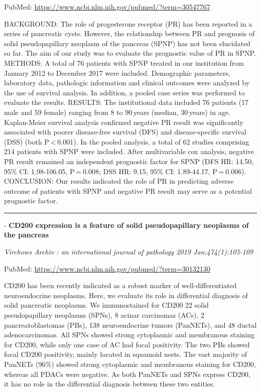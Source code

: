 \documentclass[]{article}
\begin{document}
PubMed: \url{https://www.ncbi.nlm.nih.gov/pubmed/?term=30547767}

BACKGROUND: The role of progesterone receptor (PR) has been reported in
a series of pancreatic cysts. However, the relationship between PR and
prognosis of solid pseudopapillary neoplasm of the pancreas (SPNP) has
not been elucidated so far. The aim of our study was to evaluate the
prognostic value of PR in SPNP. METHODS: A total of 76 patients with
SPNP treated in our institution from January 2012 to December 2017 were
included. Demographic parameters, laboratory data, pathologic
information and clinical outcomes were analyzed by the use of survival
analysis. In addition, a pooled case series was performed to evaluate
the results. RESULTS: The institutional data included 76 patients (17
male and 59 female) ranging from 8 to 90 years (median, 30 years) in
age. Kaplan-Meier survival analysis confirmed negative PR result was
significantly associated with poorer disease-free survival (DFS) and
disease-specific survival (DSS) (both P \textless{} 0.001). In the
pooled analysis, a total of 62 studies comprising 214 patients with SPNP
were included. After multivariable cox analysis, negative PR result
remained an independent prognostic factor for SPNP (DFS HR: 14.50, 95\%
CI: 1.98-106.05, P = 0.008; DSS HR: 9.15, 95\% CI: 1.89-44.17,
P = 0.006). CONCLUSION: Our results indicated the role of PR in
predicting adverse outcome of patients with SPNP and negative PR result
may serve as a potential prognostic factor.

{}

{}

\begin{center}\rule{0.5\linewidth}{\linethickness}\end{center}

 - \textbf{CD200 expression is a feature of solid pseudopapillary
neoplasms of the pancreas}

\emph{Virchows Archiv : an international journal of pathology 2019
Jan;474(1):105-109}

PubMed: \url{https://www.ncbi.nlm.nih.gov/pubmed/?term=30132130}

CD200 has been recently indicated as a robust marker of
well-differentiated neuroendocrine neoplasms. Here, we evaluate its role
in differential diagnosis of solid pancreatic neoplasms. We
immunostained for CD200 22 solid pseudopapillary neoplasms (SPNs), 8
acinar carcinomas (ACs), 2 pancreatoblastomas (PBs), 138 neuroendocrine
tumors (PanNETs), and 48 ductal adenocarcinomas. All SPNs showed strong
cytoplasmic and membranous staining for CD200, while only one case of AC
had focal positivity. The two PBs showed focal CD200 positivity, mainly
located in squamoid nests. The vast majority of PanNETs (96\%) showed
strong cytoplasmic and membranous staining for CD200, whereas all PDACs
were negative. As both PanNETs and SPNs express CD200, it has no role in
the differential diagnosis between these two entities.
\end{document}

